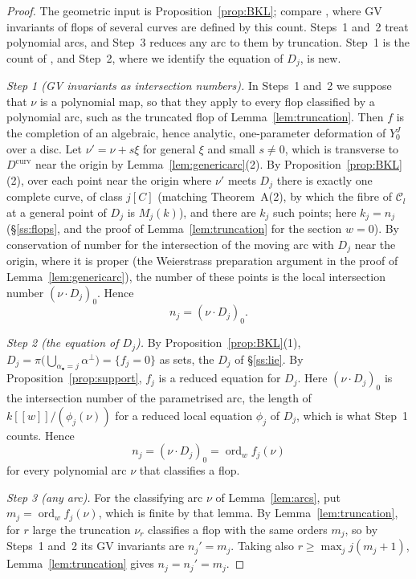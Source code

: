 \documentclass[11pt]{amsart}
\numberwithin{table}{section}
\numberwithin{figure}{section}
\numberwithin{equation}{section}
\theoremstyle{definition}
\theoremstyle{plain}
\newcommand{\cC}{\mathcal{C}}
\newcommand{\bul}{\bullet}
\DeclareMathOperator{\ord}{ord}
\begin{document}
\begin{proof}
The geometric input is Proposition~\ref{prop:BKL}; compare \cite[\S3.1, (3.A)]{NW}, where GV invariants of flops of several curves are defined by this count. Steps~1 and~2 treat polynomial arcs, and Step~3 reduces any arc to them by truncation. Step~1 is the count of \cite{BKL}, and Step~2, where we identify the equation of $D_j$, is new.

\emph{Step 1 (GV invariants as intersection numbers).} In Steps~1 and~2 we suppose that $\nu$ is a polynomial map, so that they apply to every flop classified by a polynomial arc, such as the truncated flop of Lemma~\ref{lem:truncation}. Then $f$ is the completion of an algebraic, hence analytic, one-parameter deformation of $Y_0^J$ over a disc. Let $\nu' = \nu + s\xi$ for general $\xi$ and small $s \neq 0$, which is transverse to $D^{\mathrm{curv}}$ near the origin by Lemma~\ref{lem:genericarc}(2). By Proposition~\ref{prop:BKL}(2), over each point near the origin where $\nu'$ meets $D_j$ there is exactly one complete curve, of class $j[C]$ (matching Theorem~A(2), by which the fibre of $\cC_l$ at a general point of $D_j$ is $M_j(k)$), and there are $k_j$ such points; here $k_j = n_j$ (\S\ref{ss:flops}, and the proof of Lemma~\ref{lem:truncation} for the section $w = 0$). By conservation of number for the intersection of the moving arc with $D_j$ near the origin, where it is proper (the Weierstrass preparation argument in the proof of Lemma~\ref{lem:genericarc}), the number of these points is the local intersection number $(\nu \cdot D_j)_0$. Hence
\[
n_j = (\nu \cdot D_j)_0 .
\]

\emph{Step 2 (the equation of $D_j$).} By Proposition~\ref{prop:BKL}(1), $D_j = \pi\big(\bigcup_{\alpha_\bul = j} \alpha^\perp\big) = \{f_j = 0\}$ as sets, the $D_j$ of \S\ref{ss:lie}. By Proposition~\ref{prop:support}, $f_j$ is a reduced equation for $D_j$. Here $(\nu \cdot D_j)_0$ is the intersection number of the parametrised arc, the length of $k[[w]]/(\phi_j(\nu))$ for a reduced local equation $\phi_j$ of $D_j$, which is what Step~1 counts. Hence
\[
n_j = (\nu \cdot D_j)_0 = \ord_w f_j(\nu)
\]
for every polynomial arc $\nu$ that classifies a flop.

\emph{Step 3 (any arc).} For the classifying arc $\nu$ of Lemma~\ref{lem:arcs}, put $m_j = \ord_w f_j(\nu)$, which is finite by that lemma. By Lemma~\ref{lem:truncation}, for $r$ large the truncation $\nu_r$ classifies a flop with the same orders $m_j$, so by Steps~1 and~2 its GV invariants are $n_j' = m_j$. Taking also $r \ge \max_j j(m_j + 1)$, Lemma~\ref{lem:truncation} gives $n_j = n_j' = m_j$.
\end{proof}
\end{document}
